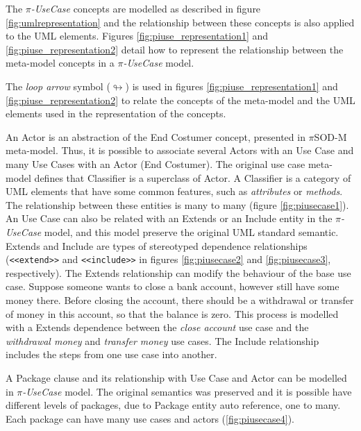 The \textit{$\pi$-UseCase} concepts are modelled as described in
figure \ref{fig:umlrepresentation} and the relationship between these concepts
is also applied to the UML elements. Figures \ref{fig:piuse_representation1} and
\ref{fig:piuse_representation2} detail how to represent the relationship
between the meta-model concepts in a \textit{$\pi$-UseCase} model. 

The \textit{loop arrow} symbol ($\looparrowright$) is used in figures
\ref{fig:piuse_representation1} and \ref{fig:piuse_representation2} to
relate the concepts of the meta-model and the UML elements used in the
representation of the concepts.



An {\sc Actor} is an abstraction of the {\sc End
Costumer} concept, presented in $\pi$SOD-M meta-model. Thus, it is possible to
associate several {\sc Actors} with an {\sc Use Case} and many {\sc Use Cases} with an {\sc
Actor} ({\sc End Costumer}). The original use case meta-model defines
that {\sc Classifier} is a superclass of {\sc Actor}. A {\sc Classifier} is a
category of UML elements that have some common features, such as
\textit{attributes} or \textit{methods}. The relationship between these entities
is many to many (figure \ref{fig:piusecase1}). An  {\sc Use Case} can also be
related with an {\sc Extends} or an {\sc Include} entity in the \textit{$\pi$-UseCase} model, and
this model preserve the original UML standard semantic. {\sc
Extends} and {\sc Include} are types of stereotyped dependence relationships
(\texttt{<<extend>>} and \texttt{<<include>>} in figures \ref{fig:piusecase2}
and \ref{fig:piusecase3}, respectively). The {\sc Extends} relationship can modify the behaviour of the base use case. Suppose someone
wants to close a bank account, however still have some money there. Before
closing the account, there should be a withdrawal or transfer of money in this
account, so that the balance is zero. This process is modelled with a {\sc
Extends} dependence between the \textit{close account} use case and
the \textit{withdrawal money} and \textit{transfer money} use cases. The {\sc Include} relationship includes
the steps from one use case into another.

A {\sc Package} clause and its relationship with {\sc Use Case} and {\sc Actor}
 can be modelled in \textit{$\pi$-UseCase} model. The original semantics was
 preserved and it is possible have different levels of packages, due to  {\sc
 Package} entity auto reference, one to many. Each package can have many use
 cases and actors (\ref{fig:piusecase4}).

